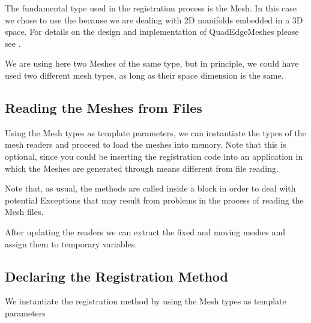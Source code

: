 \documentclass{InsightArticle}
\begin{document}
The fundamental type used in the registration process is the Mesh. In this case
we chose to use the  because we are dealing with 2D
manifolds embedded in a 3D space. For details on the design and implementation
of QuadEdgeMeshes please see \cite{Gouaillard2007}.

\begin{center}

\end{center}

We are using here two Meshes of the same type, but in principle, we could have
used two different mesh types, as long as their space dimension is the same.

\subsection{Reading the Meshes from Files}

Using the Mesh types as template parameters, we can instantiate the types of
the mesh readers and proceed to load the meshes into memory. Note that this is
optional, since you could be inserting the registration code into an
application in which the Meshes are generated through means different from file
reading.

\begin{center}

\end{center}

Note that, as usual, the  methods are called inside a
 block in order to deal with potential Exceptions that may
result from problems in the process of reading the Mesh files.

After updating the readers we can extract the fixed and moving meshes and
assign them to temporary variables.

\begin{center}

\end{center}


\subsection{Declaring the Registration Method}

We instantiate the registration method by using the Mesh types as template parameters
\end{document}

